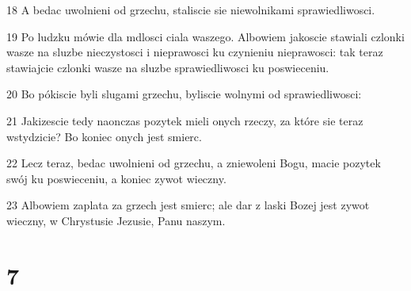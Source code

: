 \par 18 A bedac uwolnieni od grzechu, staliscie sie niewolnikami sprawiedliwosci.
\par 19 Po ludzku mówie dla mdlosci ciala waszego. Albowiem jakoscie stawiali czlonki wasze na sluzbe nieczystosci i nieprawosci ku czynieniu nieprawosci: tak teraz stawiajcie czlonki wasze na sluzbe sprawiedliwosci ku poswieceniu.
\par 20 Bo pókiscie byli slugami grzechu, byliscie wolnymi od sprawiedliwosci:
\par 21 Jakizescie tedy naonczas pozytek mieli onych rzeczy, za które sie teraz wstydzicie? Bo koniec onych jest smierc.
\par 22 Lecz teraz, bedac uwolnieni od grzechu, a zniewoleni Bogu, macie pozytek swój ku poswieceniu, a koniec zywot wieczny.
\par 23 Albowiem zaplata za grzech jest smierc; ale dar z laski Bozej jest zywot wieczny, w Chrystusie Jezusie, Panu naszym.

\chapter{7}


